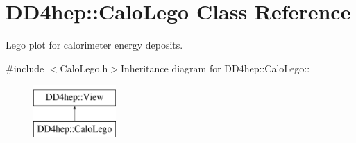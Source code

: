\hypertarget{class_d_d4hep_1_1_calo_lego}{
\section{DD4hep::CaloLego Class Reference}
\label{class_d_d4hep_1_1_calo_lego}
}


Lego plot for calorimeter energy deposits.  


{\ttfamily \#include $<$CaloLego.h$>$}Inheritance diagram for DD4hep::CaloLego::\begin{figure}[H]
\begin{center}
\leavevmode
\includegraphics[height=2cm]{class_d_d4hep_1_1_calo_lego}
\end{center}
\end{figure}
